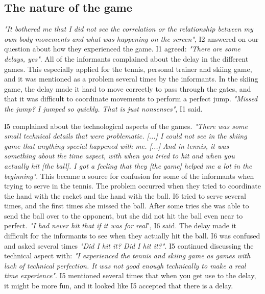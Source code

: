 \subsection{The nature of the game}
\emph{"It bothered me that I did not see the correlation or the relationship between my own body movements and what was happening on the screen"}, I2 answered on our question about how they experienced the game. I1 agreed: \emph{"There are some delays, yes"}. All of the informants complained about the delay in the different games. This especially applied for the tennis, personal trainer and skiing game, and it was mentioned as a problem several times by the informants. In the skiing game, the delay made it hard to move correctly to pass through the gates, and that it was difficult to coordinate movements to perform a perfect jump. \emph{"Missed the jump? I jumped so quickly. That is just nonsenses"}, I1 said. 

I5 complained about the technological aspects of the games. \emph{"There was some small technical details that were problematic. [...] I could not see in the skiing game that anything special happened with me. [...] And in tennis, it was something about the time aspect, with when you tried to hit and when you actually hit [the ball]. I got a feeling that they [the game] helped me a lot in the beginning"}. This became a source for confusion for some of the informants when trying to serve in the tennis. The problem occurred when they tried to coordinate the hand with the racket and the hand with the ball. I6 tried to serve several times, and the first times she missed the ball. After some tries she was able to send the ball over to the opponent, but she did not hit the ball even near to perfect. \emph{"I had never hit that if it was for real}", I6 said. The delay made it difficult for the informants to see when they actually hit the ball. I6 was confused and asked several times \emph{"Did I hit it? Did I hit it?"}. I5 continued discussing the technical aspect with: \emph{"I experienced the tennis and skiing game as games with lack of technical perfection. It was not good enough technically to make a real time experience"}. I5 mentioned several times that when you get use to the delay, it might be more fun, and it looked like I5 accepted that there is a delay. 

